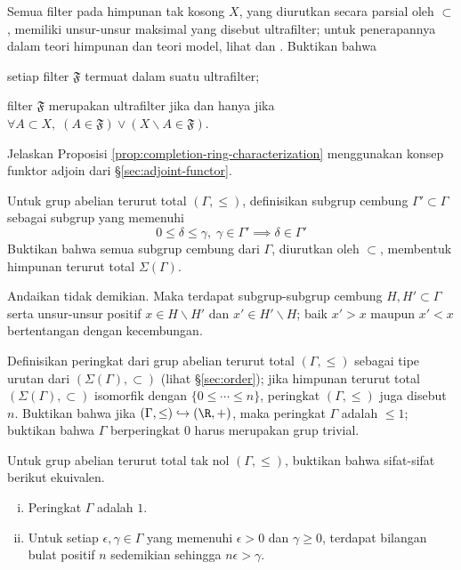 \begin{Exercises}
	\item Semua filter pada himpunan tak kosong $X$, yang diurutkan secara parsial oleh $\subset$, memiliki unsur-unsur maksimal yang disebut ultrafilter; untuk penerapannya dalam teori himpunan dan teori model, lihat \cite[\S 7]{Je03} dan \cite[\S 5.4]{Feng17}. Buktikan bahwa
		\begin{compactenum}[(i)]
			\item setiap filter $\mathfrak{F}$ termuat dalam suatu ultrafilter;
			\item filter $\mathfrak{F}$ merupakan ultrafilter jika dan hanya jika $\forall A \subset X, \; (A \in \mathfrak{F}) \vee (X \smallsetminus A \in \mathfrak{F})$.
		\end{compactenum}
	\item Jelaskan Proposisi \ref{prop:completion-ring-characterization} menggunakan konsep funktor adjoin dari \S\ref{sec:adjoint-functor}.
	\item Untuk grup abelian terurut total $(\Gamma, \leq)$, definisikan subgrup cembung $\Gamma' \subset \Gamma$ sebagai subgrup yang memenuhi
		\[ 0 \leq \delta \leq \gamma, \; \gamma \in \Gamma' \implies \delta \in \Gamma' \]
		Buktikan bahwa semua subgrup cembung dari $\Gamma$, diurutkan oleh $\subset$, membentuk himpunan terurut total $\Sigma(\Gamma)$.
		\begin{hint}
			Andaikan tidak demikian. Maka terdapat subgrup-subgrup cembung $H, H' \subset \Gamma$ serta unsur-unsur positif $x \in H \smallsetminus H'$ dan $x' \in H' \smallsetminus H$; baik $x' > x$ maupun $x' < x$ bertentangan dengan kecembungan.
		\end{hint}
	\item Definisikan peringkat dari grup abelian terurut total $(\Gamma, \leq)$ sebagai tipe urutan dari $(\Sigma(\Gamma), \subset)$ (lihat \S\ref{sec:order}); jika himpunan terurut total $(\Sigma(\Gamma), \subset)$ isomorfik dengan $\{ 0 \leq \cdots \leq n\}$, peringkat $(\Gamma, \leq)$ juga disebut $n$. Buktikan bahwa jika $(\Gamma, \leq) \hookrightarrow (\R, +)$, maka peringkat $\Gamma$ adalah $\leq 1$; buktikan bahwa $\Gamma$ berperingkat $0$ harus merupakan grup trivial.
	\item Untuk grup abelian terurut total tak nol $(\Gamma, \leq)$, buktikan bahwa sifat-sifat berikut ekuivalen.
		\begin{enumerate}[(i)]
			\item Peringkat $\Gamma$ adalah $1$.
			\item Untuk setiap $\epsilon, \gamma \in \Gamma$ yang memenuhi $\epsilon > 0$ dan $\gamma \geq 0$, terdapat bilangan bulat positif $n$ sedemikian sehingga $n\epsilon > \gamma$.

\end{enumerate}
\end{Exercises}
